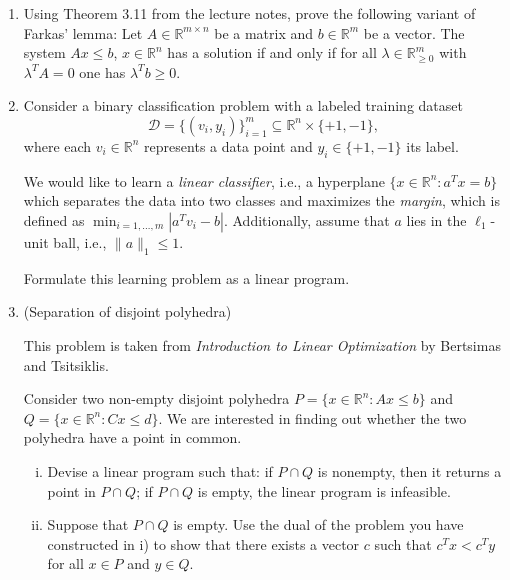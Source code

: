 \documentclass[11pt]{article}
\newcommand{\setR}{\mathbb{R}}
\newcommand{\setZ}{\mathbb{Z}}
\renewcommand{\leq}{\leqslant}
\renewcommand{\geq}{\geqslant}
\begin{document}
\begin{enumerate}[1)]

\item Using Theorem 3.11 from the lecture notes, prove the following variant of Farkas' lemma:
  Let $A\in\setR^{m\times n}$ be a matrix and $b\in\setR^m$ be a vector.
  The system $Ax \leq b$, $x\in\setR^n$ has a solution if and only if
  for all $\lambda\in\setR^m_{\geq0}$ with $\lambda^T A = 0$ one has $\lambda^T b \geq 0$.    

  
\item Consider a binary classification problem with a labeled training dataset 
\[
\mathcal{D} = \{(v_i, y_i)\}_{i=1}^m \subseteq \mathbb{R}^n \times \{+1,-1\},
\]
where each $v_i \in \mathbb{R}^n$ represents a data point and $y_i \in \{+1,-1\}$ its label.

We would like to learn a \emph{linear classifier}, i.e., a hyperplane $\{x \in \mathbb{R}^n : a^T x = b\}$ which separates the data into two classes and maximizes the \emph{margin}, which is defined as $\min_{i=1,\ldots,m} |a^T v_i - b|$.
Additionally, assume that $a$ lies in the $\ell_1$-unit ball, i.e., $\|a\|_1 \leq 1$.

Formulate this learning problem as a linear program.

\item (Separation of disjoint polyhedra) 

This problem is taken from \emph{Introduction to Linear Optimization} by Bertsimas and Tsitsiklis.

Consider two non-empty disjoint polyhedra $P=\{x \in \mathbb{R}^n : Ax \leq b\}$ and $Q=\{x \in \mathbb{R}^n : Cx \leq d\}$. We are interested in finding out whether the two polyhedra have a point in common.
\begin{enumerate}[i)]
\item Devise a linear program such that: if $P\cap Q$ is nonempty, then it returns a point in $P\cap Q$; if $P\cap Q$ is empty, the linear program is infeasible.
\item Suppose that $P\cap Q$ is empty. Use the dual of the problem you have constructed in i) to show that there exists a vector $c$ such that $c^Tx < c^Ty$ for all $x \in P$ and $y \in Q$.
\end{enumerate}




\end{enumerate}
\end{document}
